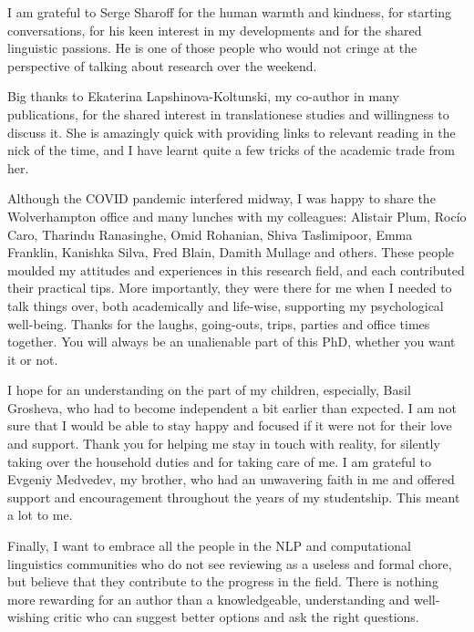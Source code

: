 I am grateful to Serge Sharoff for the human warmth and kindness, for starting conversations, for his keen interest in my developments and for the shared linguistic passions. He is one of those people who would not cringe at the perspective of talking about research over the weekend.

Big thanks to Ekaterina Lapshinova-Koltunski, my co-author in many publications, for the shared interest in translationese studies and willingness to discuss it. She is amazingly quick with providing links to relevant reading in the nick of the time, and I have learnt quite a few tricks of the academic trade from her. 

Although the COVID pandemic interfered midway, I was happy to share the Wolverhampton office and many lunches with my colleagues: Alistair Plum, Rocío Caro, Tharindu Ranasinghe, Omid Rohanian, Shiva Taslimipoor, Emma Franklin, Kanishka Silva, Fred Blain, Damith Mullage and others. These people moulded my attitudes and experiences in this research field, and each contributed their practical tips. More importantly, they were there for me when I needed to talk things over, both academically and life-wise, supporting my psychological well-being. Thanks for the laughs, going-outs, trips, parties and office times together. You will always be an unalienable part of this PhD, whether you want it or not. 

I hope for an understanding on the part of my children, especially, Basil Grosheva, who had to become independent a bit earlier than expected. I am not sure that I would be able to stay happy and focused if it were not for their love and support. Thank you for helping me stay in touch with reality, for silently taking over the household duties and for taking care of me. 
I am grateful to Evgeniy Medvedev, my brother, who had an unwavering faith in me and offered support and encouragement throughout the years of my studentship. This meant a lot to me. 

Finally, I want to embrace all the people in the NLP and computational linguistics communities who do not see reviewing as a useless and formal chore, but believe that they contribute to the progress in the field. There is nothing more rewarding for an author than a knowledgeable, understanding and well-wishing critic who can suggest better options and ask the right questions. 
